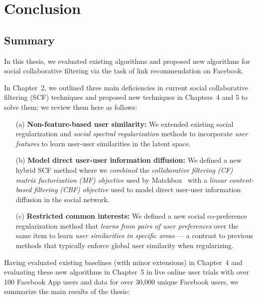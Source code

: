
\chapter{Conclusion}

\section{Summary}

In this thesis, we evaluated existing algorithms and proposed new
algorithms for social collaborative filtering via the task of link
recommendation on Facebook.

In Chapter~2, we outlined three main deficiencies in current social
collaborative filtering (SCF) techniques and proposed new techniques
in Chapters~4 and 5 to solve them; we review them here as follows:

\begin{itemize}
\item[(a)] {\bf Non-feature-based user similarity:} 
We extended existing social regularization and \emph{social spectral regularization} methods to incorporate \emph{user features} to learn user-user similarities in the latent space.
\item[(b)] {\bf Model direct user-user information diffusion:} 
We defined a new hybrid SCF method where we \emph{combined} the \emph{collaborative filtering (CF) matrix factorization (MF) objective} used by Matchbox~\cite{matchbox} with a \emph{linear content-based filtering (CBF) objective} used to model direct user-user information diffusion in the social network.
\item[(c)] {\bf Restricted common interests:}
We defined a new social co-preference regularization method that \emph{learns from pairs of user preferences} over the same item to learn \emph{user similarities in specific areas} --- a contrast to previous methods that typically enforce global user similarity when regularizing.
\end{itemize}

Having evaluated existing baselines (with minor extensions) in
Chapter~4 and evaluating these new algorithms in Chapter~5 in live
online user trials with over 100 Facebook App users and data for over
30,000 unique Facebook users, we summarize the main results of the
thesis:

